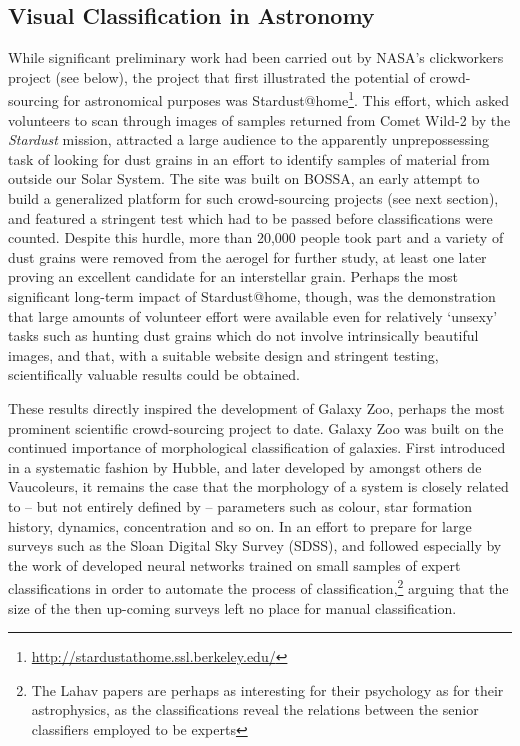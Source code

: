 \documentclass{ar2e}
\begin{document}

\subsection{Visual Classification in Astronomy}
\label{sec:class:astro}

While significant preliminary work had been carried out by NASA's clickworkers
project (see below), the project that first illustrated the potential of
crowd-sourcing for astronomical purposes was 
Stardust@home\footnote{\url{http://stardustathome.ssl.berkeley.edu/}}. This effort, which
asked volunteers to scan through images of samples returned from Comet Wild-2
by the \emph{Stardust} mission, attracted a large audience to the apparently
unprepossessing task of looking for dust grains in an effort to identify
samples of material from outside our Solar System. The site was built on
BOSSA, an early attempt to build a generalized platform for such crowd-sourcing
projects (see next section), and featured a stringent test which had to be
passed before classifications were counted. Despite this hurdle, more than
20,000 people took part and a variety of dust grains were removed from the
aerogel for further study, at least one later proving an excellent candidate
for an interstellar grain. Perhaps the most significant long-term impact of
Stardust@home, though, was the demonstration that large amounts of volunteer
effort were available even for relatively `unsexy' tasks such as hunting dust
grains which do not involve intrinsically beautiful images, and that, with a
suitable website design and stringent testing, scientifically valuable results
could be obtained. 


  These results directly inspired
the development of Galaxy Zoo, perhaps the most prominent scientific
crowd-sourcing project to date. Galaxy Zoo was built on the continued
importance of morphological classification of galaxies. First introduced in a
systematic fashion by Hubble, and later developed by amongst others de
Vaucoleurs, it remains the case that the morphology of a system is closely
related to -- but not entirely defined by -- parameters such as colour, star
formation history, dynamics, concentration and so on.  In an effort to prepare
for large surveys such as the Sloan Digital Sky Survey (SDSS),
\citet{Lahav1995} and \citet{Lahav1996} followed especially by the work of
\citet{Ball} developed neural networks trained on small samples of expert
classifications in order to automate the process of
classification,\footnote{The Lahav papers are perhaps as interesting for their
psychology as for their astrophysics, as the classifications reveal the
relations between the senior classifiers employed to be experts} arguing that
the size of the then up-coming surveys left no place for manual
classification.
\end{document}
